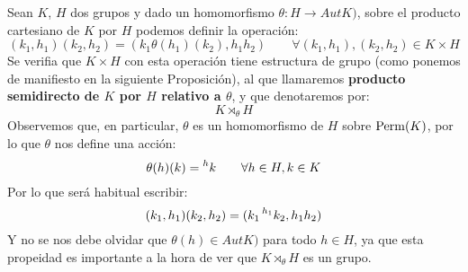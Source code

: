 \begin{definicion}
    Sean $K$, $H$ dos grupos y dado un homomorfismo $\theta:H\to AutK)$, sobre el producto cartesiano de $K$ por $H$ podemos definir la operación:
    \begin{equation*}
        (k_1,h_1)(k_2,h_2) = (k_1\theta(h_1)(k_2), h_1h_2) \qquad \forall (k_1,h_1),(k_2,h_2) \in K\times H
    \end{equation*}
    Se verifia que $K\times H$ con esta operación tiene estructura de grupo (como ponemos de manifiesto en la siguiente Proposición), al que llamaremos \textbf{producto semidirecto de $K$ por $H$ relativo a $\theta$}, y que denotaremos por:
    \begin{equation*}
        K\rtimes_\theta H
    \end{equation*}
    Observemos que, en particular, $\theta$ es un homomorfismo de $H$ sobre $\operatorname{Perm}(K)$, por lo que $\theta$ nos define una acción:
    \begin{equation*}
        \theta(h)(k) = \prescript{h}{}{k} \qquad \forall h\in H, k\in K
    \end{equation*}
    Por lo que será habitual escribir:
    \begin{equation*}
        (k_1,h_1)(k_2,h_2) = (k_1 \prescript{h_1}{}{k_2}, h_1h_2)
    \end{equation*}
    Y no se nos debe olvidar que $\theta(h) \in AutK)$ para todo $h\in H$, ya que esta propeidad es importante a la hora de ver que $K\rtimes_\theta H$ es un grupo.
\end{definicion}

